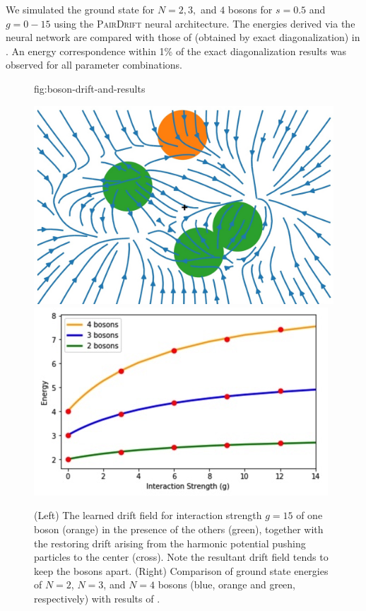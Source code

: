 \documentclass[12pt]{msml2020} %
\begin{document}
We simulated the ground state for $N = 2,3,$ and $4$ bosons for $s=0.5$ and $g=0-15$ using the \textsc{PairDrift} neural architecture. The energies derived via the neural network are compared with those of \cite{Mujal:2017aa} (obtained by exact diagonalization) in . An energy correspondence within 1\% of the exact diagonalization results was observed for all parameter combinations.
\break


\begin{figure}[htbp]
\floatconts
  {fig:boson-drift-and-results}%

  
 \includegraphics[height=0.32\textwidth]{bosons_vector_field.jpg}\hfill\includegraphics[height=0.32\textwidth]{boson_energies.jpeg}
 
 {\caption{(Left) The learned drift field for interaction strength $g=15$ of one boson (orange) in the presence of the others (green), together with the restoring drift arising from the harmonic potential pushing particles to the center (cross). Note the resultant drift field tends to keep the bosons apart. (Right) Comparison of ground state energies of $N=2$, $N=3$, and $N=4$ bosons (blue, orange and green, respectively) with results of \cite{Mujal:2017aa}.}}%
 
\end{figure}





 
 
 
\end{document}
